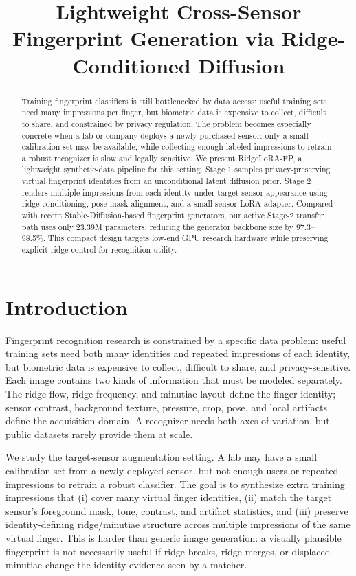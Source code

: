 \documentclass{article}
\title{Lightweight Cross-Sensor Fingerprint Generation via Ridge-Conditioned Diffusion}
\author{}
\newcommand{\method}{RidgeLoRA-FP}
\begin{document}
\maketitle

\begin{abstract}
Training fingerprint classifiers is still bottlenecked by data access: useful
training sets need many impressions per finger, but biometric data is expensive
to collect, difficult to share, and constrained by privacy regulation.  The
problem becomes especially concrete when a lab or company deploys a newly
purchased sensor: only a small calibration set may be available, while
collecting enough labeled impressions to retrain a robust recognizer is slow
and legally sensitive.  We present \method, a lightweight synthetic-data
pipeline for this setting.  Stage 1 samples privacy-preserving virtual
fingerprint identities from an unconditional latent diffusion prior.  Stage 2
renders multiple impressions from each identity under target-sensor appearance
using ridge conditioning, pose-mask alignment, and a small sensor LoRA adapter.
Compared with recent Stable-Diffusion-based fingerprint generators, our active
Stage-2 transfer path uses only 23.39M parameters, reducing the generator
backbone size by 97.3--98.5\%.  This compact design targets low-end GPU
research hardware while preserving explicit ridge control for recognition
utility.
\end{abstract}

\section{Introduction}
\label{sec:introduction}

Fingerprint recognition research is constrained by a specific data problem:
useful training sets need both many identities and repeated impressions of each
identity, but biometric data is expensive to collect, difficult to share, and
privacy-sensitive.  Each image contains two kinds of information that must be
modeled separately.  The ridge flow, ridge frequency, and minutiae layout define
the finger identity; sensor contrast, background texture, pressure, crop, pose,
and local artifacts define the acquisition domain.  A recognizer needs both
axes of variation, but public datasets rarely provide them at scale.

We study the target-sensor augmentation setting.  A lab may have a small
calibration set from a newly deployed sensor, but not enough users or repeated
impressions to retrain a robust classifier.  The goal is to synthesize extra
training impressions that (i) cover many virtual finger identities, (ii) match
the target sensor's foreground mask, tone, contrast, and artifact statistics,
and (iii) preserve identity-defining ridge/minutiae structure across multiple
impressions of the same virtual finger.  This is harder than generic image
generation: a visually plausible fingerprint is not necessarily useful if ridge
breaks, ridge merges, or displaced minutiae change the identity evidence seen by
a matcher.
\end{document}
